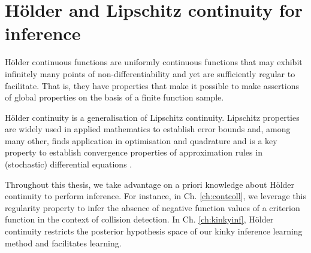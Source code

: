 \section{H\"older and Lipschitz continuity for inference}%
\label{sec:Hoelder_brief}

 
H\"older continuous functions are uniformly continuous functions that may exhibit infinitely many points of non-differentiability and yet are sufficiently regular to facilitate. That is, they have properties that make it possible to make assertions of global properties on the basis of a finite function sample. 

H\"older continuity is a generalisation of Lipschitz continuity.  Lipschitz properties are widely used in applied mathematics to establish error bounds and, among many other, finds application in optimisation \cite{Shubert:72,direct:93} and quadrature \cite{Baran2008,curbera1998,dereich2006} and is a key property to establish convergence properties of approximation rules in (stochastic) differential equations \cite{kloedenandplaten1992,Gardiner2009}. 

Throughout this thesis, we take advantage on a priori knowledge about H\"older continuity to perform inference.
For instance, in Ch. \ref{ch:contcoll}, we leverage this regularity property to infer the absence of negative function values of a criterion function in the context of collision detection. In Ch. \ref{ch:kinkyinf}, H\"older continuity restricts the posterior hypothesis space of our kinky inference learning method and facilitates learning. 

